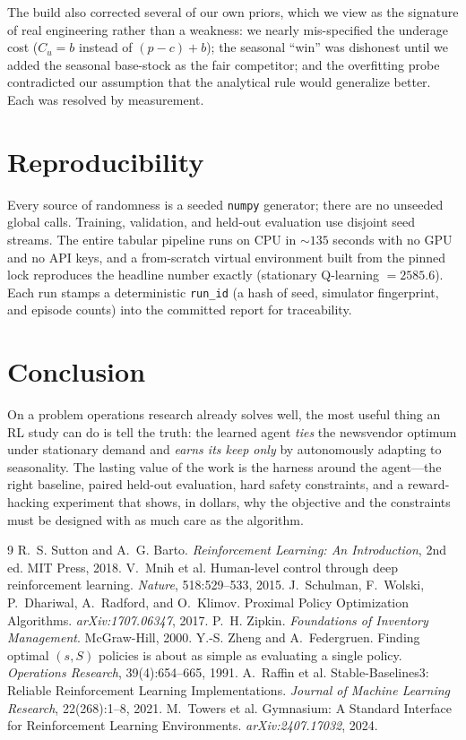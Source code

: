 \documentclass[11pt]{article}
\begin{document}
The build also corrected several of our own priors, which we view as the signature of real
engineering rather than a weakness: we nearly mis-specified the underage cost ($C_u=b$ instead of
$(p{-}c){+}b$); the seasonal ``win'' was dishonest until we added the seasonal base-stock as the
fair competitor; and the overfitting probe contradicted our assumption that the analytical rule
would generalize better. Each was resolved by measurement.

\section{Reproducibility}
\label{sec:repro}

Every source of randomness is a seeded \texttt{numpy} generator; there are no unseeded global
calls. Training, validation, and held-out evaluation use disjoint seed streams. The entire
tabular pipeline runs on CPU in $\sim$$135$ seconds with no GPU and no API keys, and a
from-scratch virtual environment built from the pinned lock reproduces the headline number
exactly (stationary Q-learning $=2585.6$). Each run stamps a deterministic \texttt{run\_id}
(a hash of seed, simulator fingerprint, and episode counts) into the committed report for
traceability.

\section{Conclusion}
\label{sec:conclusion}

On a problem operations research already solves well, the most useful thing an RL study can do is
tell the truth: the learned agent \emph{ties} the newsvendor optimum under stationary demand and
\emph{earns its keep only} by autonomously adapting to seasonality. The lasting value of the work
is the harness around the agent---the right baseline, paired held-out evaluation, hard safety
constraints, and a reward-hacking experiment that shows, in dollars, why the objective and the
constraints must be designed with as much care as the algorithm.

\begin{thebibliography}{9}
 R.~S. Sutton and A.~G. Barto. \emph{Reinforcement Learning: An
  Introduction}, 2nd ed. MIT Press, 2018.
 V.~Mnih et al. Human-level control through deep reinforcement learning.
  \emph{Nature}, 518:529--533, 2015.
 J.~Schulman, F.~Wolski, P.~Dhariwal, A.~Radford, and O.~Klimov. Proximal Policy
  Optimization Algorithms. \emph{arXiv:1707.06347}, 2017.
 P.~H. Zipkin. \emph{Foundations of Inventory Management}. McGraw-Hill, 2000.
 Y.-S. Zheng and A.~Federgruen. Finding optimal $(s,S)$ policies is about
  as simple as evaluating a single policy. \emph{Operations Research}, 39(4):654--665, 1991.
 A.~Raffin et al. Stable-Baselines3: Reliable Reinforcement Learning
  Implementations. \emph{Journal of Machine Learning Research}, 22(268):1--8, 2021.
 M.~Towers et al. Gymnasium: A Standard Interface for Reinforcement Learning
  Environments. \emph{arXiv:2407.17032}, 2024.
\end{thebibliography}
\end{document}
